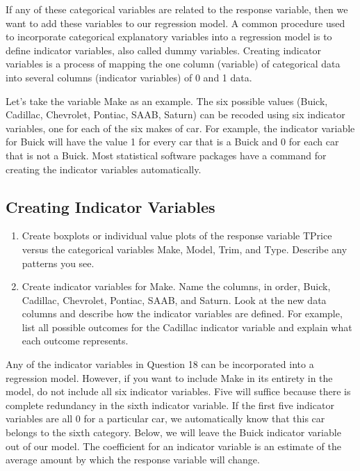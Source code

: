 \documentclass[
]{report}
\begin{document}
If any of these categorical variables are related to the response variable, then we want to add these variables to our regression model. A common procedure used to incorporate categorical explanatory variables into a regression model is to define indicator variables, also called dummy variables. Creating indicator variables is a process of mapping the one column (variable) of categorical data into several columns (indicator variables) of 0 and 1 data.

Let's take the variable Make as an example. The six possible values (Buick, Cadillac, Chevrolet, Pontiac, SAAB, Saturn) can be recoded using six indicator variables, one for each of the six makes of car. For example, the indicator variable for Buick will have the value 1 for every car that is a Buick and 0 for each car that is not a Buick. Most statistical software packages have a command for creating the indicator variables automatically.

\subsection*{Creating Indicator Variables}\label{creating-indicator-variables}

\begin{enumerate}
\def\labelenumi{\arabic{enumi}.}
\setcounter{enumi}{16}
\item
  Create boxplots or individual value plots of the response variable TPrice versus the categorical variables Make, Model, Trim, and Type. Describe any patterns you see.
\item
  Create indicator variables for Make. Name the columns, in order, Buick, Cadillac, Chevrolet, Pontiac, SAAB, and Saturn. Look at the new data columns and describe how the indicator variables are defined. For example, list all possible outcomes for the Cadillac indicator variable and explain what each outcome
  represents.
\end{enumerate}

Any of the indicator variables in Question 18 can be incorporated into a regression model. However, if you want to include Make in its entirety in the model, do not include all six indicator variables. Five will suffice because there is complete redundancy in the sixth indicator variable. If the first five indicator variables are all 0 for a particular car, we automatically know that this car belongs to
the sixth category. Below, we will leave the Buick indicator variable out of our model. The coefficient for an indicator variable is an estimate of the average amount by which the response variable will change.
\end{document}

